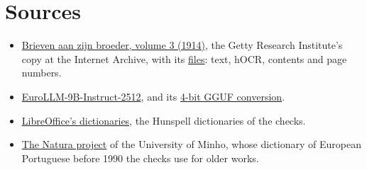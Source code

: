 \section*{Sources}
\begin{itemize}
  \item \href{https://archive.org/details/brievenaanzijnbr03gogh}{\color{pblue}Brieven aan zijn broeder, volume 3
    (1914)}, the Getty Research Institute's copy at the Internet Archive, with its
    \href{https://archive.org/metadata/brievenaanzijnbr03gogh/files}{\color{pblue}files}: text, hOCR, contents and
    page numbers.
  \item \href{https://huggingface.co/utter-project/EuroLLM-9B-Instruct-2512}{\color{pblue}EuroLLM-9B-Instruct-2512},
    and its \href{https://huggingface.co/mradermacher/EuroLLM-9B-Instruct-2512-GGUF}{\color{pblue}4-bit GGUF
    conversion}.
  \item \href{https://github.com/LibreOffice/dictionaries}{\color{pblue}LibreOffice's dictionaries}, the Hunspell
    dictionaries of the checks.
  \item \href{https://natura.di.uminho.pt}{\color{pblue}The Natura project} of the University of Minho, whose
    dictionary of European Portuguese before 1990 the checks use for older works.
\end{itemize}


